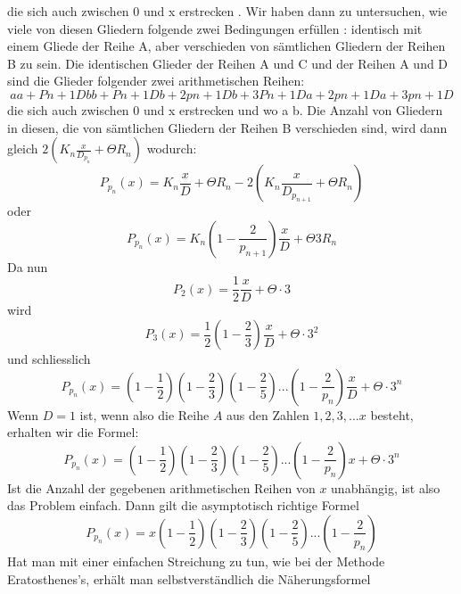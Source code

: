 \documentclass{article}
\begin{document}
die sich auch zwischen 0 und x erstrecken . Wir haben dann zu untersuchen, wie viele von diesen Gliedern folgende zwei Bedingungen erfüllen : identisch mit einem Gliede der Reihe A, aber verschieden von sämtlichen Gliedern der Reihen B zu sein.
Die identischen Glieder der Reihen A und C und der Reihen A und D sind die Glieder folgender zwei arithmetischen Reihen:$$a a +Pn+1 D b b + Pn+ 1D b + 2pn+ 1 D b + 3Pn+ 1 D a + 2pn+1D a + 3pn+1 D$$
die sich auch zwischen 0 und x erstrecken und wo a b. Die Anzahl von Gliedern in diesen, die von sämtlichen Gliedern der Reihen B verschieden sind, wird dann gleich $2\left(K_n\frac{x}{D_{p_n}}+\Theta R_n\right)$ wodurch:
$$P_{p_n}(x)=K_n\frac{x}{D}+\Theta R_n-2\left(K_n\frac{x}{D_{p_{n+1}}}+\Theta R_n\right)$$
oder$$P_{p_n}(x)=K_n(1-\frac{2}{p_{n+1}})\frac{x}{D}+\Theta 3R_n$$Da nun$$P_2(x)=\frac{1}{2}\frac{x}{D}+\Theta\cdot3$$wird$$P_3(x)=\frac{1}{2}\left(1-\frac{2}{3}\right)\frac{x}{D}+\Theta\cdot3^2$$und schliesslich$$P_{p_n}(x)=\left(1-\frac{1}{2}\right)\left(1-\frac{2}{3}\right)\left(1-\frac{2}{5}\right)...\left(1-\frac{2}{p_n}\right)\frac{x}{D}+\Theta\cdot3^n$$
Wenn $D=1$ ist, wenn also die Reihe $A$ aus den Zahlen $1 ,2,3,... x$ besteht, erhalten wir die Formel:$$P_{p_n}(x)=\left(1-\frac{1}{2}\right)\left(1-\frac{2}{3}\right)\left(1-\frac{2}{5}\right)...\left(1-\frac{2}{p_n}\right)x+\Theta\cdot3^n$$Ist die Anzahl der gegebenen arithmetischen Reihen von $x$ unabhängig, ist also das Problem einfach. Dann gilt die asymptotisch richtige Formel$$P_{p_n}(x)=x\left(1-\frac{1}{2}\right)\left(1-\frac{2}{3}\right)\left(1-\frac{2}{5}\right)...\left(1-\frac{2}{p_n}\right)$$Hat man mit einer einfachen Streichung zu tun, wie bei der Methode Eratosthenes's, erhält man selbstverständlich die Näherungsformel
\end{document}
